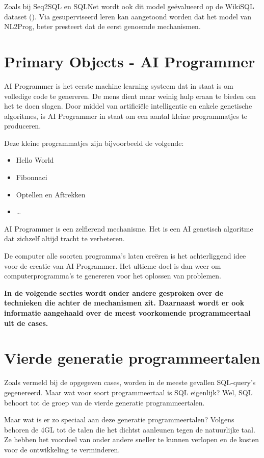Zoals bij Seq2SQL en SQLNet wordt ook dit model geëvalueerd op de WikiSQL dataset (\textcite{wikisql}). Via gesuperviseerd leren kan aangetoond worden dat het model van NL2Prog, beter presteert dat de eerst genoemde mechanismen. 

\section{Primary Objects - AI Programmer}

AI Programmer is het eerste machine learning systeem dat in staat is om volledige code te genereren. De mens dient maar weinig hulp eraan te bieden om het te doen slagen. Door middel van artificiële intelligentie en enkele genetische algoritmes, is AI Programmer in staat om een aantal kleine programmatjes te produceren. 

Deze kleine programmatjes zijn bijvoorbeeld de volgende:
\begin{itemize}
	\item Hello World
	\item Fibonnaci
	\item Optellen en Aftrekken
	\item \dots
\end{itemize}

AI Programmer is een zelflerend mechanisme. Het is een AI genetisch algoritme dat zichzelf altijd tracht te verbeteren.

De computer alle soorten programma’s laten creëren is het achterliggend idee voor de creatie van AI Programmer. Het ultieme doel is dan weer om computerprogramma’s te genereren voor het oplossen van problemen.

\textbf{In de volgende secties wordt onder andere gesproken over de technieken die achter de mechanismen zit. Daarnaast wordt er ook informatie aangehaald over de meest voorkomende programmeertaal uit de cases.}
\section{Vierde generatie programmeertalen}

Zoals vermeld bij de opgegeven cases, worden in de meeste gevallen SQL-query’s gegenereerd. Maar wat voor soort programmeertaal is SQL eigenlijk? Wel, SQL behoort tot de groep van de vierde generatie programmeertalen. 

Maar wat is er zo speciaal aan deze generatie programmeertalen? Volgens \textcite{fourthgenpl} behoren de 4GL tot de talen die het dichtst aanleunen tegen de natuurlijke taal. Ze hebben het voordeel van onder andere sneller te kunnen verlopen en de kosten voor de ontwikkeling te verminderen.

